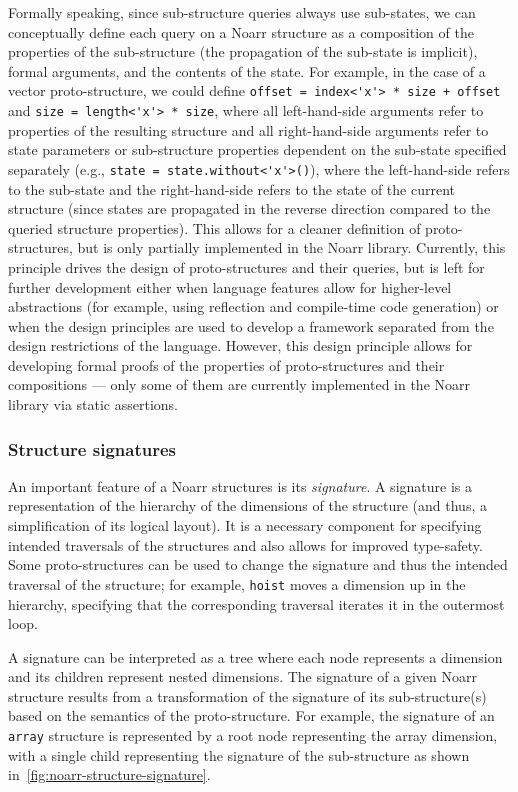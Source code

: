  Formally speaking, since sub-structure queries always use sub-states, we can conceptually define each query on a Noarr structure as a composition of the properties of the sub-structure (the propagation of the sub-state is implicit), formal arguments, and the contents of the state. For example, in the case of a vector proto-structure, we could define \lstinline{offset = index<'x'> * size + offset} and \lstinline{size = length<'x'> * size}, where all left-hand-side arguments refer to properties of the resulting structure and all right-hand-side arguments refer to state parameters or sub-structure properties dependent on the sub-state specified separately (e.g., \lstinline{state = state.without<'x'>()}), where the left-hand-side refers to the sub-state and the right-hand-side refers to the state of the current structure (since states are propagated in the reverse direction compared to the queried structure properties). This allows for a cleaner definition of proto-structures, but is only partially implemented in the Noarr library. Currently, this principle drives the design of proto-structures and their queries, but is left for further development either when language features allow for higher-level abstractions (for example, using reflection and compile-time code generation) or when the design principles are used to develop a framework separated from the design restrictions of the \cpp language. However, this design principle allows for developing formal proofs of the properties of proto-structures and their compositions --- only some of them are currently implemented in the Noarr library via static assertions.


\subsubsection*{Structure signatures}

An important feature of a Noarr structures is its \emph{signature}. A signature is a representation of the hierarchy of the dimensions of the structure (and thus, a simplification of its logical layout). It is a necessary component for specifying intended traversals of the structures and also allows for improved type-safety. Some proto-structures can be used to change the signature and thus the intended traversal of the structure; for example, \lstinline{hoist} moves a dimension up in the hierarchy, specifying that the corresponding traversal iterates it in the outermost loop.

A signature can be interpreted as a tree where each node represents a dimension and its children represent nested dimensions.
The signature of a given Noarr structure results from a transformation of the signature of its sub-structure(s) based on the semantics of the proto-structure. For example, the signature of an \lstinline{array} structure is represented by a root node representing the array dimension, with a single child representing the signature of the sub-structure as shown in~\cref{fig:noarr-structure-signature}.

